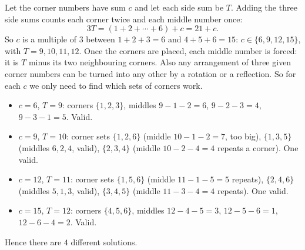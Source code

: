 Let the corner numbers have sum $c$ and let each side sum be $T$. Adding the three side sums counts each corner twice and each middle number once:
\[
3T=(1+2+\cdots+6)+c=21+c .
\]
So $c$ is a multiple of $3$ between $1+2+3=6$ and $4+5+6=15$: $c\in\{6,9,12,15\}$, with $T=9,10,11,12$. Once the corners are placed, each middle number is forced: it is $T$ minus its two neighbouring corners. Also any arrangement of three given corner numbers can be turned into any other by a rotation or a reflection. So for each $c$ we only need to find which sets of corners work.
\begin{itemize}
\item $c=6$, $T=9$: corners $\{1,2,3\}$, middles $9-1-2=6$, $9-2-3=4$, $9-3-1=5$. Valid.
\item $c=9$, $T=10$: corner sets $\{1,2,6\}$ (middle $10-1-2=7$, too big), $\{1,3,5\}$ (middles $6,2,4$, valid), $\{2,3,4\}$ (middle $10-2-4=4$ repeats a corner). One valid.
\item $c=12$, $T=11$: corner sets $\{1,5,6\}$ (middle $11-1-5=5$ repeats), $\{2,4,6\}$ (middles $5,1,3$, valid), $\{3,4,5\}$ (middle $11-3-4=4$ repeats). One valid.
\item $c=15$, $T=12$: corners $\{4,5,6\}$, middles $12-4-5=3$, $12-5-6=1$, $12-6-4=2$. Valid.
\end{itemize}
Hence there are $\boxed{4}$ different solutions.
